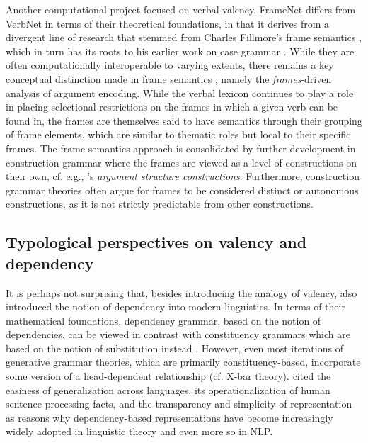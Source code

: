 Another computational project focused on verbal valency, FrameNet differs from VerbNet in terms of their theoretical foundations, in that it derives from a divergent line of research that stemmed from Charles Fillmore's frame semantics \citep{fillmore1977, fillmore1977a, fillmore1982}, which in turn has its roots to his earlier work on case grammar \citep{fillmore1968,fillmore1970}. While they are often computationally interoperable to varying extents, there remains a key conceptual distinction made in frame semantics \citet{fillmore1968}, namely the \textit{frames}-driven analysis of argument encoding. While the verbal lexicon continues to play a role in placing selectional restrictions on the frames in which a given verb can be found in, the frames are themselves said to have semantics through their grouping of frame elements, which are similar to thematic roles but local to their specific frames. The frame semantics approach is consolidated by further development in construction grammar where the frames are viewed as a level of constructions on their own, cf. e.g., \citet{goldberg1992,goldberg1995}'s \textit{argument structure constructions}. Furthermore, construction grammar theories often argue for frames to be considered distinct or autonomous constructions, as it is not strictly predictable from other constructions.

\subsection{Typological perspectives on valency and dependency}\label{subsec:typology}

It is perhaps not surprising that, besides introducing the analogy of valency, \citet{tesniere1959} also introduced the notion of dependency into modern linguistics. In terms of their mathematical foundations, dependency grammar, based on the notion of dependencies, can be viewed in contrast with constituency grammars which are based on the notion of substitution instead \citep{stabler2019}. However, even most iterations of generative grammar theories, which are primarily constituency-based, incorporate some version of a head-dependent relationship (cf. X-bar theory). \citet{demarneffe2019} cited the easiness of generalization across languages, its operationalization of human sentence processing facts, and the transparency and simplicity of representation as reasons why dependency-based representations have become increasingly widely adopted in linguistic theory and even more so in NLP.

